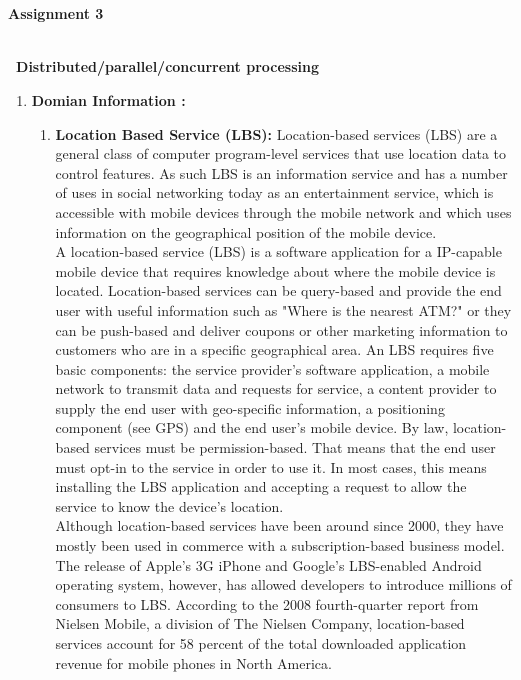 \\
\\
\pagebreak
\textbf{\hspace{55mm} \large Assignment 3}\\
\\
\begin{flushleft}
\textbf{\ Distributed/parallel/concurrent processing}\\
\end{flushleft}
\begin{enumerate}
\item\textbf{Domian Information :}
\begin{enumerate}
\item\textbf{Location Based Service (LBS):}
\hspace*{0.5}Location-based services (LBS) are a general class of computer program-level services that use location data to control features. As such LBS is an information service and has a number of uses in social networking today as an entertainment service, which is accessible with mobile devices through the mobile network and which uses information on the geographical position of the mobile device. \\
\hspace*{0.5in}A location-based service (LBS) is a software application for a IP-capable mobile device that requires knowledge about where the mobile device is located. Location-based services can be query-based and provide the end user with useful information such as "Where is the nearest ATM?" or they can be push-based and deliver coupons or other marketing information to customers who are in a specific geographical area. An LBS requires five basic components: the service provider's software application, a mobile network to transmit data and requests for service, a content provider to supply the end user with geo-specific information, a positioning component (see GPS) and the end user's mobile device. By law, location-based services must be permission-based. That means that the end user must opt-in to the service in order to use it. In most cases, this means installing the LBS application and accepting a request to allow the service to know the device's location.\\
\hspace*{0.5in}Although location-based services have been around since 2000, they have mostly been used in commerce with a subscription-based business model. The release of Apple's 3G iPhone and Google's LBS-enabled Android operating system, however, has allowed developers to introduce millions of consumers to LBS. According to the 2008 fourth-quarter report from Nielsen Mobile, a division of The Nielsen Company, location-based services account for 58 percent of the total downloaded application revenue for mobile phones in North America.\\

\end{enumerate}
\end{enumerate}
